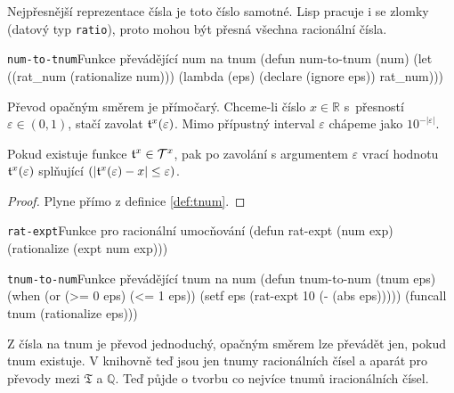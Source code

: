 Nejpřesnější reprezentace čísla je toto číslo samotné. Lisp pracuje i se zlomky (datový typ \texttt{ratio}), proto mohou být přesná všechna racionální čísla.

\begin{lispcode}{\texttt{num-to-tnum}}{Funkce převádějící num na tnum}
(\textcolor{funkcionalni}{defun} \textcolor{pojmenovan}{num-to-tnum} (num)
  (\textcolor{vedlejsi}{let} ((rat_num (\textcolor{matematicke}{rationalize} num)))
    (\textcolor{funkcionalni}{lambda} (eps) (\textcolor{vedlejsi}{declare} (\textcolor{vedlejsi}{ignore} eps))
      rat_num)))
\end{lispcode}

Převod opačným směrem je přímočarý. Chceme-li číslo $x\in\mathbb{R}$ s~přesností $\varepsilon\in{(0,1)}$, stačí zavolat $\mathfrak{t}^{x}(\varepsilon)$. Mimo přípustný interval $\varepsilon$ chápeme jako $10^{-|\varepsilon|}$.

\begin{lemma}
Pokud existuje funkce $\mathfrak{t}^{x}\in\mathcal{T}^{x}$, pak po zavolání s argumentem $\varepsilon$ vrací hodnotu $\mathfrak{t}^{x}(\varepsilon)$ splňující $(|\mathfrak{t}^{x}(\varepsilon) - x |\leq \varepsilon)$.
\begin{proof}
Plyne přímo z definice \ref{def:tnum}.
\end{proof}
\end{lemma}

\begin{lispcode}{\texttt{rat-expt}}{Funkce pro racionální umocňování}
(\textcolor{funkcionalni}{defun} \textcolor{pojmenovan}{rat-expt} (num exp)
  (\textcolor{matematicke}{rationalize} (\textcolor{matematicke}{expt} num exp)))
\end{lispcode}

\begin{lispcode}{\texttt{tnum-to-num}}{Funkce převádějící tnum na num}
(\textcolor{funkcionalni}{defun} \textcolor{pojmenovan}{tnum-to-num} (tnum eps)
  (\textcolor{funkcionalni}{when} (\textcolor{funkcionalni}{or} (\textcolor{matematicke}{>=} 0 eps) (\textcolor{matematicke}{<=} 1 eps))
    (\textcolor{vedlejsi}{setf} eps (\textcolor{moje}{rat-expt} 10 (\textcolor{matematicke}{-} (\textcolor{matematicke}{abs} eps)))))
  (\textcolor{funkcionalni}{funcall} tnum (\textcolor{matematicke}{rationalize} eps)))
\end{lispcode}

Z čísla na tnum je převod jednoduchý, opačným směrem lze převádět jen, pokud tnum existuje. V knihovně teď jsou jen tnumy racionálních čísel a aparát pro převody mezi $\mathfrak{T}$ a $\mathbb{Q}$. Teď půjde o tvorbu co nejvíce tnumů iracionálních čísel.

